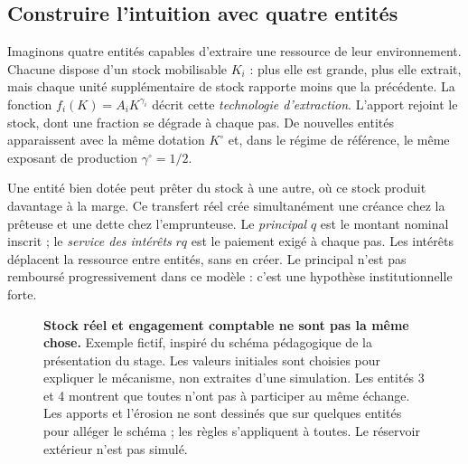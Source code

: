 \subsection{Construire l'intuition avec quatre entités}
Imaginons quatre entités capables d'extraire une ressource de leur
environnement. Chacune dispose d'un stock mobilisable $K_i$ : plus elle
est grande, plus elle extrait, mais chaque unité supplémentaire de stock
rapporte moins que la précédente. La fonction $f_i(K)=A_iK^{\gamma_i}$
décrit cette \emph{technologie d'extraction}. L'apport rejoint le stock,
dont une fraction se dégrade à chaque pas. De nouvelles entités apparaissent
avec la même dotation $K^\circ$ et, dans le régime de référence,
le même exposant de production $\gamma^\circ=1/2$.

Une entité bien dotée peut prêter du stock à une autre, où ce stock produit
davantage à la marge. Ce transfert réel crée simultanément une créance
chez la prêteuse et une dette chez l'emprunteuse. Le \emph{principal} $q$
est le montant nominal inscrit ; le \emph{service des intérêts} $rq$ est
le paiement exigé à chaque pas. Les intérêts déplacent la ressource entre
entités, sans en créer. Le principal n'est pas remboursé progressivement
dans ce modèle : c'est une hypothèse institutionnelle forte.

\begin{figure}[htbp]\centering
{}
\caption{\textbf{Stock réel et engagement comptable ne sont pas la même chose.}
Exemple fictif, inspiré du schéma pédagogique de la présentation du stage.
Les valeurs initiales sont choisies pour expliquer le mécanisme, non extraites
d'une simulation. Les entités 3 et 4 montrent que toutes n'ont pas à participer
au même échange. Les apports et l'érosion ne sont dessinés que sur quelques
entités pour alléger le schéma ; les règles s'appliquent à toutes.
Le réservoir extérieur n'est pas simulé.}
\label{fig:exemple}
\end{figure}

